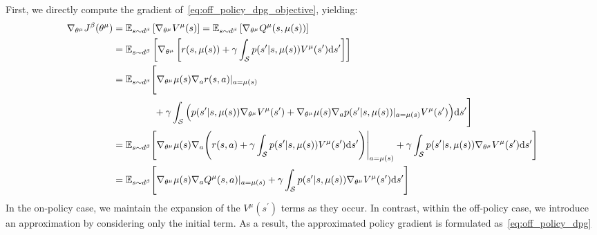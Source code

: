 \documentclass{article}
\begin{document}
\begin{tcolorbox}[breakable,enhanced,colback=gray!10!white,colframe=gray!50!black,
title={Off-Policy Deterministic Policy Gradient (Off-Policy DPG)}]
First, we directly compute the gradient of~\cref{eq:off_policy_dpg_objective}, yielding:
\begin{align*}
    \nabla_{\theta^\mu} J^\beta(\theta^\mu) &= \BBE_{s \sim d^\beta} \left[\nabla_{\theta^\mu} V^\mu(s)\right] = \BBE_{s \sim d^\beta} \left[\nabla_{\theta^\mu} Q^\mu(s, \mu(s))\right]\\
    &=\BBE_{s \sim d^\beta} \left[\nabla_{\theta^\mu} \left[r(s, \mu(s)) + \gamma  \int_\SSS p(s^\prime\vert s, \mu(s)) V^\mu(s^\prime) \rmd s^\prime \right] \right]\\
    &= \BBE_{s \sim d^\beta} \Bigg[\nabla_{\theta^\mu} \mu(s) \nabla_a r(s,a)\vert_{a=\mu(s)} \\
    & \hphantom{=\BBE_{s \sim d^\beta}\Bigg[} + \gamma \int_\SSS\Big(p(s^\prime\vert s, \mu(s))\nabla_{\theta^\mu}V^\mu(s^\prime) + \nabla_{\theta^\mu} \mu(s) \nabla_a p(s^\prime\vert s, \mu(s))\vert_{a=\mu(s)} V^\mu(s^\prime) \Big)\rmd s^\prime \Bigg]\\
    &= \BBE_{s \sim d^\beta} \Bigg[\nabla_{\theta^\mu} \mu(s) \nabla_a \Bigg(r(s,a) + \gamma \int_\SSS p(s^\prime\vert s, \mu(s)) V^\mu(s^\prime)\rmd s^\prime\Bigg)\Bigg\vert_{a=\mu(s)}+ \gamma \int_\SSS p(s^\prime\vert s, \mu(s))\nabla_{\theta^\mu}V^\mu(s^\prime) \rmd s^\prime\Bigg]\\
    &= \BBE_{s \sim d^\beta} \Bigg[\nabla_{\theta^\mu} \mu(s) \nabla_a Q^\mu(s,a)\vert_{a=\mu(s)}+ \gamma \int_\SSS p(s^\prime\vert s, \mu(s))\nabla_{\theta^\mu}V^\mu(s^\prime) \rmd s^\prime\Bigg]
\end{align*}
In the on-policy case, we maintain the expansion of the $V^\mu(s^\prime)$ terms as they occur. In contrast, within the off-policy case, we introduce an approximation by considering only the initial term. As a result, the approximated policy gradient is formulated as~\eqref{eq:off_policy_dpg}
\end{tcolorbox}
\end{document}
